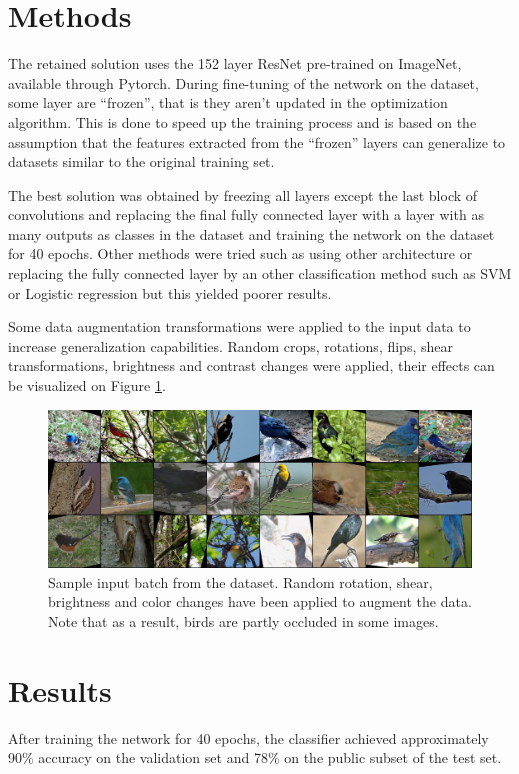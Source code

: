 \documentclass[10pt,twocolumn,letterpaper]{article}
\begin{document}
\section{Methods}
The retained solution uses the 152 layer ResNet \cite{DBLP:journals/corr/HeZRS15}  pre-trained on ImageNet, available through Pytorch. During fine-tuning of the network on the dataset, some layer are ``frozen'', that is they aren't updated in the optimization algorithm. This is done to speed up the training process and is based on the assumption that the features extracted from the ``frozen'' layers can generalize to datasets similar to the original training set. 

The best solution was obtained by freezing all layers except the last block of convolutions and replacing the final fully connected layer with a layer with as many outputs as classes in the dataset and training the network on the dataset for 40 epochs. Other methods were tried such as using other architecture or replacing the fully connected layer by an other classification method such as SVM or Logistic regression but this yielded poorer results. 

Some data augmentation transformations were applied to the input data to increase generalization capabilities. Random crops, rotations, flips, shear transformations, brightness and contrast changes were applied, their effects can be visualized on Figure \ref{fig}.
\begin{figure}[h]
\centering
\includegraphics[width=.9\linewidth]{"sample copy"}
\caption{Sample input batch from the dataset. Random rotation, shear, brightness and color changes have been applied to augment the data. Note that as a result, birds are partly occluded in some images. }
\label{fig}
\end{figure}
\section{Results}
After training the network for 40 epochs, the classifier achieved approximately 90\% accuracy on the validation set and 78\% on the public subset of the test set. 

{\small


}
\end{document}
